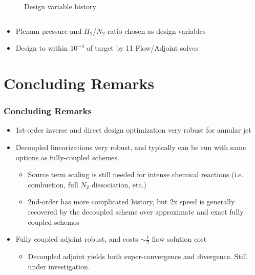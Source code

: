 \documentclass{beamer}
\begin{document}
\begin{frame}
\begin{columns}
\begin{column}{0.5\textwidth}
\begin{figure}[h]
        \caption{Design variable history}
        \label{fig:dv-hist}
      \end{figure}
    \end{column}
  \end{columns}
  \begin{itemize}
    \item Plenum pressure and $H_2$/$N_2$ ratio chosen as design variables
    \item Design to within $10^{-4}$ of target by 11 Flow/Adjoint solves
  \end{itemize}
\end{frame}
\section{Concluding Remarks}
\begin{frame}
  \frametitle{Concluding Remarks}
  \begin{itemize}
    \item 1st-order inverse and direct design optimization very robust for
      annular jet
    \item Decoupled linearizations very robust, and typically can be run with
      same options as fully-coupled schemes.  
      \begin{itemize}
        \item Source term scaling is still needed for intense chemical reactions
          (i.e.  combustion, full $N_2$ dissociation, etc.)
        \item 2nd-order has more complicated history, but 2x speed is generally
          recovered by the decoupled scheme over approximate and exact fully coupled
          schemes
      \end{itemize}
    \item Fully coupled adjoint robust, and costs $\sim \frac{1}{2}$ flow
      solution cost
      \begin{itemize}
        \item Decoupled adjoint yields both super-convergence and divergence.  Still
          under investigation.
      \end{itemize}
  \end{itemize}
\end{frame}
\end{document}

